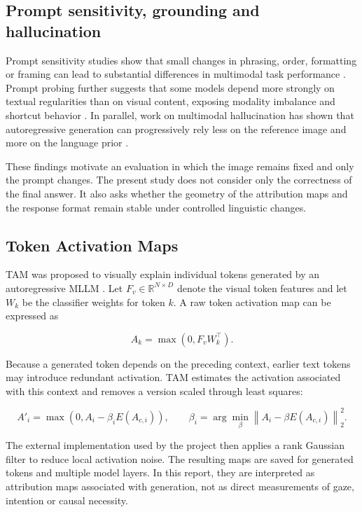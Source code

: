 \documentclass[11pt,a4paper]{article}
\begin{document}
\subsection{Prompt sensitivity, grounding and hallucination}

Prompt sensitivity studies show that small changes in phrasing, order, formatting or framing can lead to substantial differences in multimodal task performance \cite{ismithdeen2025promptception}. Prompt probing further suggests that some models depend more strongly on textual regularities than on visual content, exposing modality imbalance and shortcut behavior \cite{qi2023promptprobing}. In parallel, work on multimodal hallucination has shown that autoregressive generation can progressively rely less on the reference image and more on the language prior \cite{favero2024hallucination}.

These findings motivate an evaluation in which the image remains fixed and only the prompt changes. The present study does not consider only the correctness of the final answer. It also asks whether the geometry of the attribution maps and the response format remain stable under controlled linguistic changes.

\subsection{Token Activation Maps}

TAM was proposed to visually explain individual tokens generated by an autoregressive MLLM \cite{li2025tam}. Let $F_v \in \mathbb{R}^{N \times D}$ denote the visual token features and let $W_k$ be the classifier weights for token $k$. A raw token activation map can be expressed as

\begin{equation}
A_k = \max\left(0, F_v W_k^{\top}\right).
\end{equation}

Because a generated token depends on the preceding context, earlier text tokens may introduce redundant activation. TAM estimates the activation associated with this context and removes a version scaled through least squares:

\begin{equation}
A'_i = \max\left(0, A_i - \beta_i E(A_{c,i})\right),
\qquad
\beta_i = \arg\min_{\beta}\left\|A_i - \beta E(A_{c,i})\right\|_2^2.
\end{equation}

The external implementation used by the project then applies a rank Gaussian filter to reduce local activation noise. The resulting maps are saved for generated tokens and multiple model layers. In this report, they are interpreted as attribution maps associated with generation, not as direct measurements of gaze, intention or causal necessity.
\end{document}
